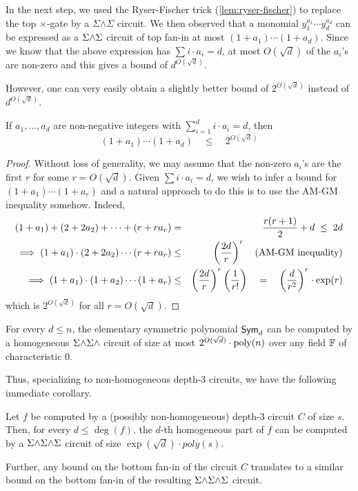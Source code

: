 In the next step, we used the Ryser-Fischer trick
(\autoref{lem:ryser-fischer}) to replace the top $\times$-gate by a
$\Sigma\mathord{\wedge}\Sigma$ circuit.
We then observed that a monomial $y_1^{a_1}\cdots y_d^{a_d}$ can be
expressed as a $\Sigma\mathord{\wedge}\Sigma$ circuit of top fan-in at most $(1 + a_1)\cdots
(1+a_d)$.
Since we know that the above expression has $\sum i \cdot a_i = d$, at
most $O(\sqrt{d})$ of the $a_i$'s are non-zero and this gives a bound
of $d^{O(\sqrt{d})}$. 

However, one can very easily obtain a slightly better bound of
$2^{O(\sqrt{d})}$ instead of $d^{O(\sqrt{d})}$. 

\begin{proposition}\label{prop:sym-d5-am-gm}
If $a_1,\dots, a_d$ are non-negative integers with $\sum_{i=1}^d i \cdot a_i  = d$, then 
\[
(1+a_1)\cdots (1+a_d) \quad \leq \quad 2^{O(\sqrt{d})}
\]
\end{proposition}
\begin{proof}
  Without loss of generality, we may assume that the non-zero $a_i$'s
  are the first $r$ for some $r = O(\sqrt{d})$.
  Given $\sum i \cdot a_i = d$, we wish to infer a bound for
  $(1+a_1)\cdots (1+a_r)$ and a natural approach to do this is to use
  the AM-GM inequality somehow.
  Indeed,
  \begin{eqnarray*}
    (1 + a_1) + (2 + 2a_2) + \cdots + (r + r a_r) & = & \frac{r(r+1)}{2} + d \; \leq \;2d \\
    \implies    (1 + a_1) \cdot (2 + 2a_2) \cdots (r + r a_r) & \leq & \left(\frac{2d}{r}\right)^r \quad\text{(AM-GM inequality)}\\
    \implies    (1 + a_1) \cdot (1 + a_2) \cdots (1 + a_r) & \leq & \left(\frac{2d}{r}\right)^r \left(\frac{1}{r!}\right) \quad = \quad \left(\frac{d}{r^2}\right)^r \cdot \exp(r)
  \end{eqnarray*}
  which is $2^{O(\sqrt{d})}$ for all $r = O(\sqrt{d})$. 
\end{proof}

\begin{corollary}\label{cor:d5-pow-for-esym}
  For every $d \leq n$, the elementary symmetric polynomial $\mathsf{Sym}_d$
  can be computed by a homogeneous $\Sigma\mathord{\wedge}\Sigma\mathord{\wedge}$ circuit of size at most
  $2^{O(\sqrt{d})} \cdot \mathrm{poly}(n)$ over any field $\mathbb{F}$ of
  characteristic $0$.
\end{corollary}

Thus, specializing to non-homogeneous depth-$3$ circuits, we have the
following immediate corollary. 

\begin{corollary}\label{cor:d5-pow-for-nonhom-d3}
  Let $f$ be computed by a (possibly non-homogeneous) depth-$3$
  circuit $C$ of size $s$.
  Then, for every $d \leq \deg(f)$, the $d$-th homogeneous part of $f$
  can be computed by a $\Sigma\mathord{\wedge}\Sigma\mathord{\wedge}\Sigma$ circuit of size $\exp(\sqrt{d}) \cdot
  poly(s)$.

  Further, any bound on the bottom fan-in of the circuit $C$
  translates to a similar bound on the bottom fan-in of the resulting
  $\Sigma\mathord{\wedge}\Sigma\mathord{\wedge}\Sigma$ circuit. 
\end{corollary}

